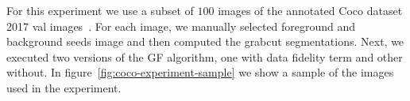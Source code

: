 \documentclass[smallextended]{svjour3}
\begin{document}
For this experiment we use a subset of $100$ images of the annotated Coco dataset 2017 val images~\cite{lin2014microsoft}. For each image, we manually selected foreground and background seeds image and then computed the grabcut segmentations. Next, we executed two versions of the GF algorithm, one with data fidelity term and other without. In figure~\ref{fig:coco-experiment-sample} we show a sample of the images used in the experiment.
%
%
%
\begin{figure}
\center
{}
\end{figure}
\end{document}
